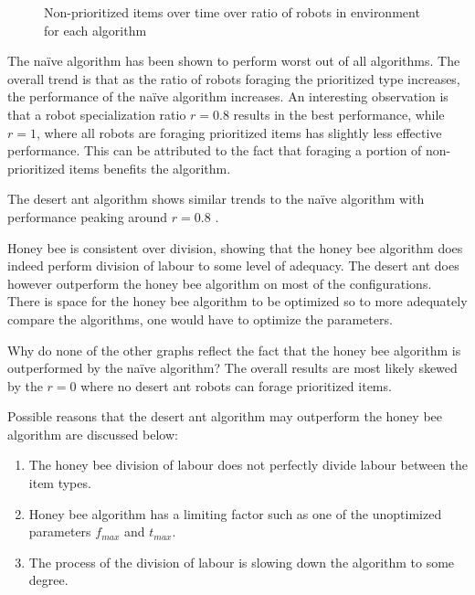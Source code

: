 \begin{figure}[!htb]
\centering
\resizebox{\textwidth}{!}{}
\caption{Non-prioritized items over time over ratio of robots in environment for each algorithm}
\label{divisionwasteplot}
\end{figure}

The na\"ive algorithm has been shown to perform worst out of all algorithms. The overall trend is that as the ratio of robots foraging the prioritized type increases, the performance of the na\"ive algorithm increases. An interesting observation is that a robot specialization ratio $r=0.8$ results in the best performance, while $r=1$, where all robots are foraging prioritized items has slightly less effective performance. This can be attributed to the fact that foraging a portion of non-prioritized items benefits the algorithm.       

The desert ant algorithm shows similar trends to the na\"ive algorithm with performance peaking around $r=0.8$ . 

Honey bee is consistent over division, showing that the honey bee algorithm does indeed perform division of labour to some level of adequacy. The desert ant does however outperform the honey bee algorithm on most of the configurations. There is space for the honey bee algorithm to be optimized so to more adequately compare the algorithms, one would have to optimize the parameters. 

Why do none of the other graphs reflect the fact that the honey bee algorithm is outperformed by the na\"ive algorithm? The overall results are most likely skewed by the $r=0$ where no desert ant robots can forage prioritized items. 

Possible reasons that the desert ant algorithm may outperform the honey bee algorithm are discussed below:
\begin{enumerate}
\item The honey bee division of labour does not perfectly divide labour between the item types.
\item Honey bee algorithm has a limiting factor such as one of the unoptimized parameters $f_{max}$ and $t_{max}$. 
\item The process of the division of labour is slowing down the algorithm to some degree.
\end{enumerate}


